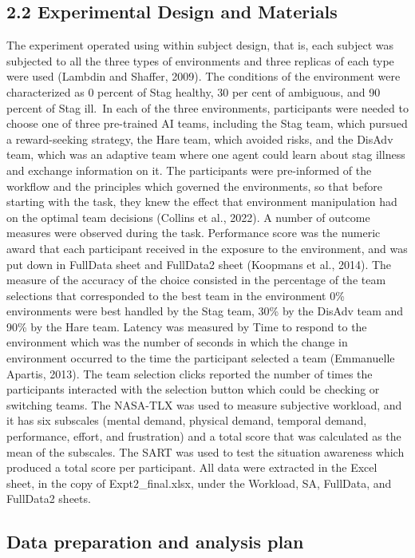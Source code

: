 \documentclass[
]{article}
\begin{document}
\subsection{2.2 Experimental Design and
Materials}\label{experimental-design-and-materials}

The experiment operated using within subject design, that is, each
subject was subjected to all the three types of environments and three
replicas of each type were used (Lambdin and Shaffer, 2009). The
conditions of the environment were characterized as 0 percent of Stag
healthy, 30 per cent of ambiguous, and 90 percent of Stag ill.~In each
of the three environments, participants were needed to choose one of
three pre-trained AI teams, including the Stag team, which pursued a
reward-seeking strategy, the Hare team, which avoided risks, and the
DisAdv team, which was an adaptive team where one agent could learn
about stag illness and exchange information on it. The participants were
pre-informed of the workflow and the principles which governed the
environments, so that before starting with the task, they knew the
effect that environment manipulation had on the optimal team decisions
(Collins et al., 2022). A number of outcome measures were observed
during the task. Performance score was the numeric award that each
participant received in the exposure to the environment, and was put
down in FullData sheet and FullData2 sheet (Koopmans et al., 2014). The
measure of the accuracy of the choice consisted in the percentage of the
team selections that corresponded to the best team in the environment
0\% environments were best handled by the Stag team, 30\% by the DisAdv
team and 90\% by the Hare team. Latency was measured by Time to respond
to the environment which was the number of seconds in which the change
in environment occurred to the time the participant selected a team
(Emmanuelle Apartis, 2013). The team selection clicks reported the
number of times the participants interacted with the selection button
which could be checking or switching teams. The NASA-TLX was used to
measure subjective workload, and it has six subscales (mental demand,
physical demand, temporal demand, performance, effort, and frustration)
and a total score that was calculated as the mean of the subscales. The
SART was used to test the situation awareness which produced a total
score per participant. All data were extracted in the Excel sheet, in
the copy of Expt2\_final.xlsx, under the Workload, SA, FullData, and
FullData2 sheets.

\subsection{Data preparation and analysis
plan}\label{data-preparation-and-analysis-plan}
\end{document}
